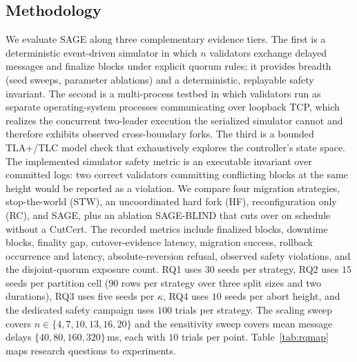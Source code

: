 \documentclass[journal]{IEEEtran}
\theoremstyle{remark}
\begin{document}
\subsection{Methodology}
We evaluate SAGE along three complementary evidence tiers. The first is a
deterministic event-driven simulator in which $n$ validators exchange delayed messages and
finalize blocks under explicit quorum rules; it provides breadth (seed sweeps, parameter
ablations) and a deterministic, replayable safety invariant. The second is a multi-process
testbed in which validators run as separate operating-system processes communicating over
loopback TCP, which realizes the concurrent two-leader execution the serialized simulator cannot
and therefore exhibits observed cross-boundary forks. The third is a bounded TLA+/TLC model check
that exhaustively explores the controller's state space. The implemented simulator safety metric
is an executable invariant over committed logs: two correct validators committing conflicting
blocks at the same height would be reported as a violation. We compare
four migration strategies, stop-the-world (STW), an uncoordinated hard fork (HF),
reconfiguration only (RC), and SAGE, plus an ablation SAGE-BLIND that cuts over on schedule
without a CutCert. The recorded metrics include finalized blocks, downtime blocks,
finality gap, cutover-evidence latency, migration success, rollback occurrence and latency,
absolute-reversion refusal, observed safety violations, and the disjoint-quorum exposure count.
RQ1 uses $30$ seeds per strategy, RQ2 uses $15$ seeds per partition cell ($90$ rows per strategy
over three split sizes and two durations), RQ3 uses five seeds per $\kappa$, RQ4 uses $10$ seeds
per abort height, and the dedicated safety campaign uses $100$ trials per strategy. The scaling
sweep covers $n\in\{4,7,10,13,16,20\}$ and the sensitivity sweep covers mean message delays
$\{40,80,160,320\}\,$ms, each with $10$ trials per point. Table~\ref{tab:rqmap} maps research
questions to experiments.
\end{document}
